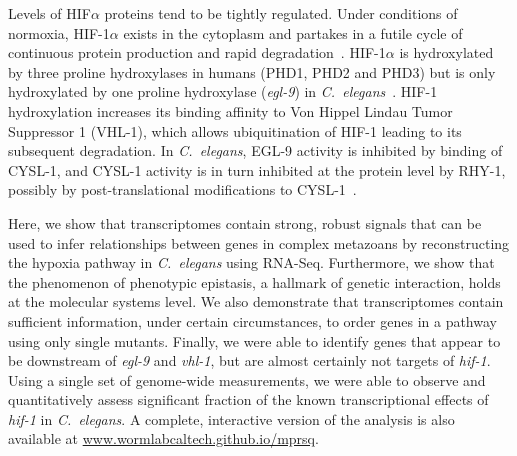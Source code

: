 \documentclass[9pt,twocolumn,twoside]{pnas-new}
\newcommand{\cel}{\emph{C.~elegans}}
\newcommand{\egl}{\emph{egl-9}}
\newcommand{\rhy}{\emph{rhy-1}}
\newcommand{\vhl}{\emph{vhl-1}}
\newcommand{\hif}{\emph{hif-1}}
\newcommand{\eglp}{EGL-9}
\newcommand{\rhyp}{RHY-1}
\newcommand{\vhlp}{VHL-1}
\newcommand{\hifp}{HIF-1}
\newcommand{\cyslp}{CYSL-1}
\begin{document}
Levels of HIF$\alpha$ proteins tend to be tightly regulated. Under conditions of
normoxia, \hifp{}$\alpha$ exists in the cytoplasm and partakes in a futile cycle
of continuous protein production and rapid degradation~\cite{Huang1996}.
\hifp{}$\alpha$ is hydroxylated by three proline hydroxylases
in humans (PHD1, PHD2 and PHD3) but is only hydroxylated by one proline
hydroxylase (\egl{}) in \cel{}~\cite{Kaelin2008}. \hifp{} hydroxylation increases its
binding affinity to Von Hippel Lindau Tumor Suppressor 1 (\vhlp{}), which allows
ubiquitination of \hifp{} leading to its subsequent degradation. In \cel{},
\eglp{} activity is inhibited by binding of \cyslp{}, and \cyslp{} activity is
in turn inhibited at the protein level by \rhyp{}, possibly by
post-translational modifications to \cyslp{}~\cite{Ma2012}.

Here, we show that transcriptomes contain strong, robust signals that can be
used to infer relationships between genes in complex metazoans by reconstructing
the hypoxia pathway in \cel{} using RNA-Seq.
Furthermore, we show that the phenomenon of phenotypic epistasis, a hallmark of
genetic interaction, holds at the molecular systems level.
We also demonstrate that transcriptomes contain sufficient information, under
certain circumstances, to order genes in a pathway using only single mutants.
Finally, we were able to identify genes that appear to be downstream of \egl{}
and \vhl{}, but are almost certainly not targets of \hif{}.
Using a single set of genome-wide measurements, we were able to observe and
quantitatively assess  significant fraction of the known transcriptional
effects of \hif{} in \cel{}.
A complete, interactive version of the analysis is also available at
\url{www.wormlabcaltech.github.io/mprsq}.
\end{document}
